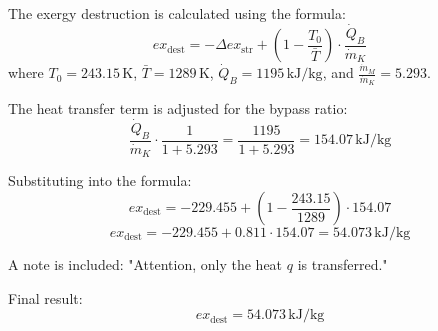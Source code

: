 The exergy destruction is calculated using the formula:  
\[
ex_{\text{dest}} = -\Delta ex_{\text{str}} + \left(1 - \frac{T_0}{\bar{T}}\right) \cdot \frac{\dot{Q}_B}{\dot{m}_K}
\]  
where \( T_0 = 243.15 \, \text{K} \), \( \bar{T} = 1289 \, \text{K} \), \( \dot{Q}_B = 1195 \, \text{kJ/kg} \), and \( \frac{\dot{m}_M}{\dot{m}_K} = 5.293 \).  

The heat transfer term is adjusted for the bypass ratio:  
\[
\frac{\dot{Q}_B}{\dot{m}_K} \cdot \frac{1}{1 + 5.293} = \frac{1195}{1 + 5.293} = 154.07 \, \text{kJ/kg}
\]  

Substituting into the formula:  
\[
ex_{\text{dest}} = -229.455 + \left(1 - \frac{243.15}{1289}\right) \cdot 154.07
\]  
\[
ex_{\text{dest}} = -229.455 + 0.811 \cdot 154.07 = 54.073 \, \text{kJ/kg}
\]  

A note is included: "Attention, only the heat \( q \) is transferred."  

Final result:  
\[
ex_{\text{dest}} = 54.073 \, \text{kJ/kg}
\]